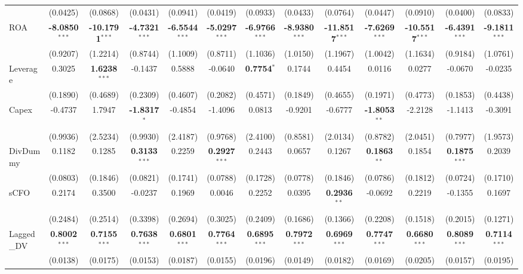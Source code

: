 \begin{landscape}
\begin{table}[H]
\begin{tabular}{lcccccccccccc}
 & (0.0425) & (0.0868) & (0.0431) & (0.0941) & (0.0419) & (0.0933) & (0.0433) & (0.0764) & (0.0447) & (0.0910) & (0.0400) & (0.0833) \\
ROA & \textbf{-8.0850}$^{***}$ & \textbf{-10.1791}$^{***}$ & \textbf{-4.7321}$^{***}$ & \textbf{-6.5544}$^{***}$ & \textbf{-5.0297}$^{***}$ & \textbf{-6.9766}$^{***}$ & \textbf{-8.9380}$^{***}$ & \textbf{-11.8517}$^{***}$ & \textbf{-7.6269}$^{***}$ & \textbf{-10.5517}$^{***}$ & \textbf{-6.4391}$^{***}$ & \textbf{-9.1811}$^{***}$ \\
 & (0.9207) & (1.2214) & (0.8744) & (1.1009) & (0.8711) & (1.1036) & (1.0150) & (1.1967) & (1.0042) & (1.1634) & (0.9184) & (1.0761) \\
Leverage & 0.3025 & \textbf{1.6238}$^{***}$ & -0.1437 & 0.5888 & -0.0640 & \textbf{0.7754}$^{*}$ & 0.1744 & 0.4454 & 0.0116 & 0.0277 & -0.0670 & -0.0235 \\
 & (0.1890) & (0.4689) & (0.2309) & (0.4607) & (0.2082) & (0.4571) & (0.1849) & (0.4655) & (0.1971) & (0.4773) & (0.1853) & (0.4438) \\
Capex & -0.4737 & 1.7947 & \textbf{-1.8317}$^{*}$ & -0.4854 & -1.4096 & 0.0813 & -0.9201 & -0.6777 & \textbf{-1.8053}$^{**}$ & -2.2128 & -1.1413 & -0.3091 \\
 & (0.9936) & (2.5234) & (0.9930) & (2.4187) & (0.9768) & (2.4100) & (0.8581) & (2.0134) & (0.8782) & (2.0451) & (0.7977) & (1.9573) \\
DivDummy & 0.1182 & 0.1285 & \textbf{0.3133}$^{***}$ & 0.2259 & \textbf{0.2927}$^{***}$ & 0.2443 & 0.0657 & 0.1267 & \textbf{0.1863}$^{**}$ & 0.1854 & \textbf{0.1875}$^{***}$ & 0.2039 \\
 & (0.0803) & (0.1846) & (0.0821) & (0.1741) & (0.0788) & (0.1728) & (0.0778) & (0.1846) & (0.0786) & (0.1812) & (0.0724) & (0.1710) \\
sCFO & 0.2174 & 0.3500 & -0.0237 & 0.1969 & 0.0046 & 0.2252 & 0.0395 & \textbf{0.2936}$^{**}$ & -0.0692 & 0.2219 & -0.1355 & 0.1697 \\
 & (0.2484) & (0.2514) & (0.3398) & (0.2694) & (0.3025) & (0.2409) & (0.1686) & (0.1366) & (0.2208) & (0.1518) & (0.2015) & (0.1271) \\
Lagged\_DV & \textbf{0.8002}$^{***}$ & \textbf{0.7155}$^{***}$ & \textbf{0.7638}$^{***}$ & \textbf{0.6801}$^{***}$ & \textbf{0.7764}$^{***}$ & \textbf{0.6895}$^{***}$ & \textbf{0.7972}$^{***}$ & \textbf{0.6969}$^{***}$ & \textbf{0.7747}$^{***}$ & \textbf{0.6680}$^{***}$ & \textbf{0.8089}$^{***}$ & \textbf{0.7114}$^{***}$ \\
 & (0.0138) & (0.0175) & (0.0153) & (0.0187) & (0.0155) & (0.0196) & (0.0149) & (0.0182) & (0.0169) & (0.0205) & (0.0157) & (0.0195) \\

\end{tabular}
\end{table}
\end{landscape}
